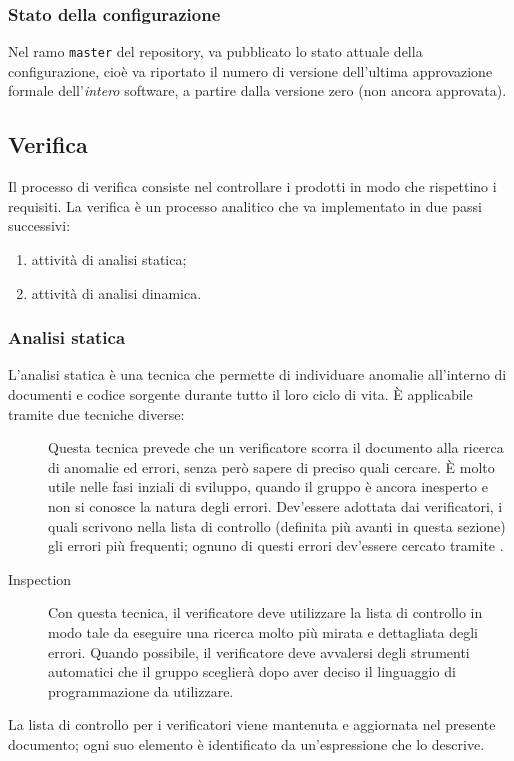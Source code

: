 		\subsubsection{Stato della configurazione}
		Nel ramo \texttt{master} del repository, va pubblicato lo stato attuale della configurazione, cioè va riportato il numero di versione dell'ultima approvazione formale dell'\emph{intero} software, a partire dalla versione zero (non ancora approvata).
		
	
	
	
	
	
	\subsection{Verifica}
		Il processo di verifica consiste nel controllare i prodotti in modo che rispettino i requisiti. %
		La verifica è un processo analitico che va implementato in due passi successivi:
		\begin{enumerate}
			\item attività di analisi statica;
			\item attività di analisi dinamica.
		\end{enumerate}
		
			\subsubsection{Analisi statica}
			L'analisi statica è una tecnica che permette di individuare anomalie all'interno di documenti e codice sorgente durante tutto il loro ciclo di vita. È applicabile tramite due tecniche diverse:
			\begin{description}
				\item[] Questa tecnica prevede che un verificatore scorra il documento alla ricerca di anomalie ed errori, senza però sapere di preciso quali cercare. È molto utile nelle fasi inziali di sviluppo, quando il gruppo è ancora inesperto e non si conosce la natura degli errori. Dev'essere adottata dai verificatori, i quali scrivono nella lista di controllo (definita più avanti in questa sezione) gli errori più frequenti; ognuno di questi errori dev'essere cercato tramite .
				\item[Inspection] Con questa tecnica, il verificatore deve utilizzare la lista di controllo in modo tale da eseguire una ricerca molto più mirata e dettagliata degli errori. Quando possibile, il verificatore deve avvalersi degli strumenti automatici che il gruppo sceglierà dopo aver deciso il linguaggio di programmazione da utilizzare.
			\end{description}
			La lista di controllo per i verificatori viene mantenuta e aggiornata nel presente documento; ogni suo elemento è identificato da un'espressione che lo descrive.
